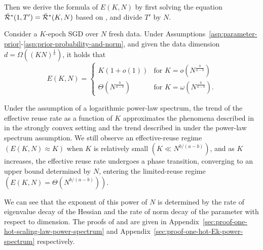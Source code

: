 Then we derive the formula of $E(K, N)$ by first solving the equation $\Bar{\mathcal{R}}^*(1,T')=\Bar{\mathcal{R}}^*(K,N)$ based on , and divide $T'$ by $N$.
\begin{theorem} \label{thm:one-hot-E_K-v2}
    Consider a $K$-epoch SGD over $N$ fresh data. Under Assumptions~\ref{asp:parameter-prior}-\ref{asp:prior-probability-and-norm}, and given the data dimension $d = \Omega((KN)^{\frac{1}{a}})$, it holds that
    \[
    E(K, N) =
    \begin{cases}
         K(1 + o(1)) & \text{for } K = o(N^{\frac{b}{a-b}}) \\
         \Theta(N^{\frac{b}{a-b}}) & \text{for } K = \omega(N^{\frac{b}{a-b}}).
    \end{cases}
    \]
\end{theorem}
Under the assumption of a logarithmic power-law spectrum, the trend of the effective reuse rate as a function of \( K \) approximates the phenomena described in  in the strongly convex setting and the trend described in  under the power-law spectrum assumption.
We still observe an effective-reuse regime $(E(K, N) \approx K)$ when \( K \) is relatively small $( K \ll N^{b/(a-b)})$, and as \( K \) increases, the effective reuse rate undergoes a phase transition, converging to an upper bound determined by \( N \), entering the limited-reuse regime $(E(K, N) =  \Theta(N^{b/(a-b)}))$. 

We can see that the exponent of this power of $N$ is determined by the rate of eigenvalue decay of the Hessian and the rate of norm decay of the parameter with respect to dimension. The proofs of  and  are given in Appendix~\ref{sec:proof-one-hot-scaling-law-power-spectrum} and Appendix~\ref{sec:proof-one-hot-Ek-power-spectrum} respectively.


